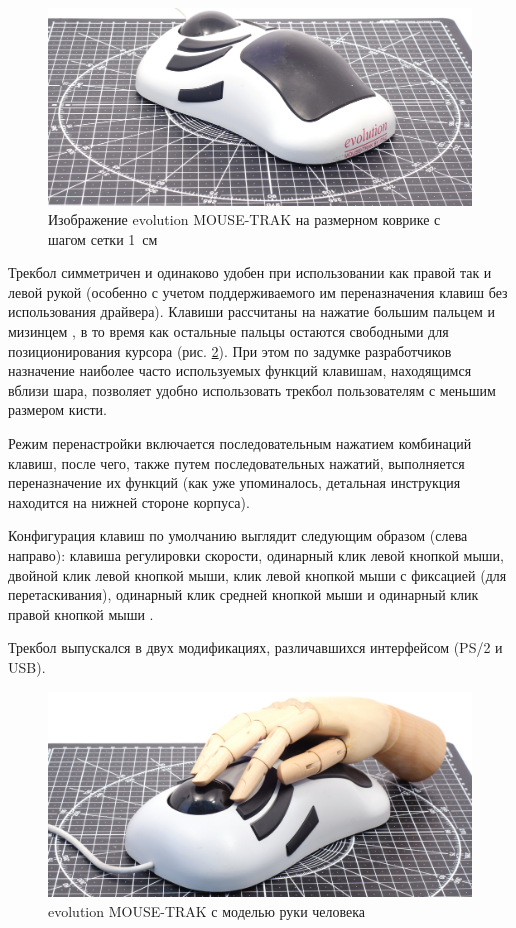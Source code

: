 \documentclass[11pt, a4paper]{article}
\begin{document}
\begin{figure}[h]
    \centering
    \includegraphics[scale=0.35]{1997_mousetrak_evolution/size_30.jpg}
    \caption{Изображение evolution MOUSE-TRAK на размерном коврике с шагом сетки 1~см}
    \label{fig:evolutionMOUSE-TRAKSize}
\end{figure}

Трекбол симметричен и одинаково удобен при использовании как правой так и левой рукой (особенно с учетом поддерживаемого им переназначения клавиш без использования драйвера).
Клавиши рассчитаны на нажатие большим пальцем и мизинцем \cite{pcmag}, в то время как остальные пальцы остаются свободными для позиционирования курсора (рис. \ref{fig:evolutionMOUSE-TRAKHand}). При этом по задумке разработчиков назначение наиболее часто используемых функций клавишам, находящимся вблизи шара, позволяет удобно использовать трекбол пользователям с меньшим размером кисти.

Режим перенастройки включается последовательным нажатием комбинаций клавиш, после чего, также путем последовательных нажатий, выполняется переназначение их функций (как уже упоминалось, детальная инструкция находится на нижней стороне корпуса).

Конфигурация клавиш по умолчанию выглядит следующим образом (слева направо): клавиша регулировки скорости, одинарный клик левой кнопкой мыши, двойной клик левой кнопкой мыши, клик левой кнопкой мыши с фиксацией (для перетаскивания), одинарный клик средней кнопкой мыши и одинарный клик правой кнопкой мыши \cite{advanced}.

Трекбол выпускался в двух модификациях, различавшихся интерфейсом (PS/2 и USB).

\begin{figure}[h]
    \centering
    \includegraphics[scale=0.35]{1997_mousetrak_evolution/hand_30.jpg}
    \caption{evolution MOUSE-TRAK с моделью руки человека}
    \label{fig:evolutionMOUSE-TRAKHand}
\end{figure}
\end{document}
